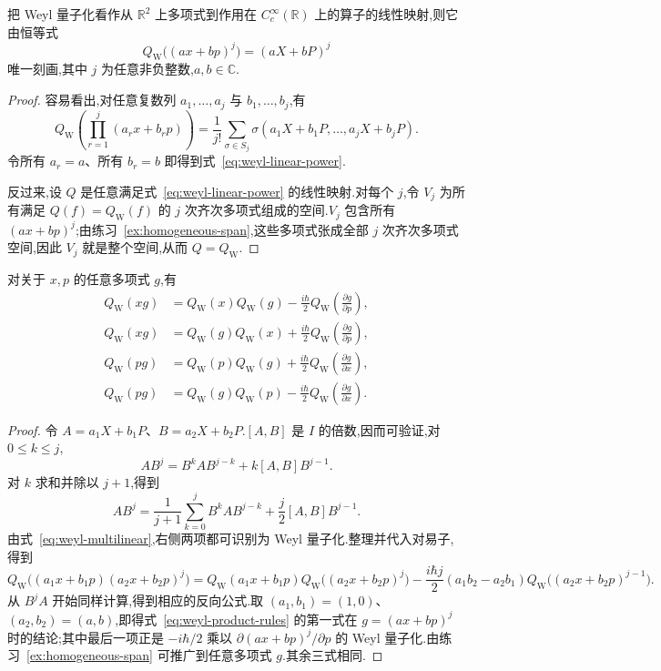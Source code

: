 \begin{proposition}\label{prop:weyl-linear-characterization}
把 Weyl 量子化看作从 $\mathbb R^2$ 上多项式到作用在 $C_c^\infty(\mathbb R)$ 上的算子的线性映射,则它由恒等式
\[
Q_{\mathrm W}\bigl((ax+bp)^j\bigr)=(aX+bP)^j
\label{eq:weyl-linear-power}
\]
唯一刻画,其中 $j$ 为任意非负整数,$a,b\in\mathbb C$.
\end{proposition}

\begin{proof}
容易看出,对任意复数列 $a_1,\ldots,a_j$ 与 $b_1,\ldots,b_j$,有
\[
Q_{\mathrm W}\left(\prod_{r=1}^j(a_rx+b_rp)\right)
=\frac1{j!}\sum_{\sigma\in S_j}
\sigma(a_1X+b_1P,\ldots,a_jX+b_jP).
\label{eq:weyl-multilinear}
\]
令所有 $a_r=a$、所有 $b_r=b$ 即得到式~\eqref{eq:weyl-linear-power}.

反过来,设 $Q$ 是任意满足式~\eqref{eq:weyl-linear-power} 的线性映射.对每个 $j$,令 $V_j$ 为所有满足 $Q(f)=Q_{\mathrm W}(f)$ 的 $j$ 次齐次多项式组成的空间.$V_j$ 包含所有 $(ax+bp)^j$;由练习~\ref{ex:homogeneous-span},这些多项式张成全部 $j$ 次齐次多项式空间,因此 $V_j$ 就是整个空间,从而 $Q=Q_{\mathrm W}$.
\end{proof}

\begin{proposition}\label{prop:weyl-multiplication}
对关于 $x,p$ 的任意多项式 $g$,有
\begin{align}
Q_{\mathrm W}(xg)&=Q_{\mathrm W}(x)Q_{\mathrm W}(g)-\frac{i\hbar}{2}Q_{\mathrm W}\left(\frac{\partial g}{\partial p}\right),\\
Q_{\mathrm W}(xg)&=Q_{\mathrm W}(g)Q_{\mathrm W}(x)+\frac{i\hbar}{2}Q_{\mathrm W}\left(\frac{\partial g}{\partial p}\right),\\
Q_{\mathrm W}(pg)&=Q_{\mathrm W}(p)Q_{\mathrm W}(g)+\frac{i\hbar}{2}Q_{\mathrm W}\left(\frac{\partial g}{\partial x}\right),\\
Q_{\mathrm W}(pg)&=Q_{\mathrm W}(g)Q_{\mathrm W}(p)-\frac{i\hbar}{2}Q_{\mathrm W}\left(\frac{\partial g}{\partial x}\right).
\label{eq:weyl-product-rules}
\end{align}
\end{proposition}

\begin{proof}
令 $A=a_1X+b_1P$、$B=a_2X+b_2P$.$[A,B]$ 是 $I$ 的倍数,因而可验证,对 $0\leq k\leq j$,
\[
AB^j=B^kAB^{j-k}+k[A,B]B^{j-1}.
\]
对 $k$ 求和并除以 $j+1$,得到
\[
AB^j=\frac1{j+1}\sum_{k=0}^jB^kAB^{j-k}
+\frac{j}{2}[A,B]B^{j-1}.
\]
由式~\eqref{eq:weyl-multilinear},右侧两项都可识别为 Weyl 量子化.整理并代入对易子,得到
\[
Q_{\mathrm W}\bigl((a_1x+b_1p)(a_2x+b_2p)^j\bigr)
=Q_{\mathrm W}(a_1x+b_1p)Q_{\mathrm W}\bigl((a_2x+b_2p)^j\bigr)
-\frac{i\hbar j}{2}(a_1b_2-a_2b_1)Q_{\mathrm W}\bigl((a_2x+b_2p)^{j-1}\bigr).
\]
从 $B^jA$ 开始同样计算,得到相应的反向公式.取 $(a_1,b_1)=(1,0)$、$(a_2,b_2)=(a,b)$,即得式~\eqref{eq:weyl-product-rules} 的第一式在 $g=(ax+bp)^j$ 时的结论;其中最后一项正是 $-i\hbar/2$ 乘以 $\partial (ax+bp)^j/\partial p$ 的 Weyl 量子化.由练习~\ref{ex:homogeneous-span} 可推广到任意多项式 $g$.其余三式相同.
\end{proof}

